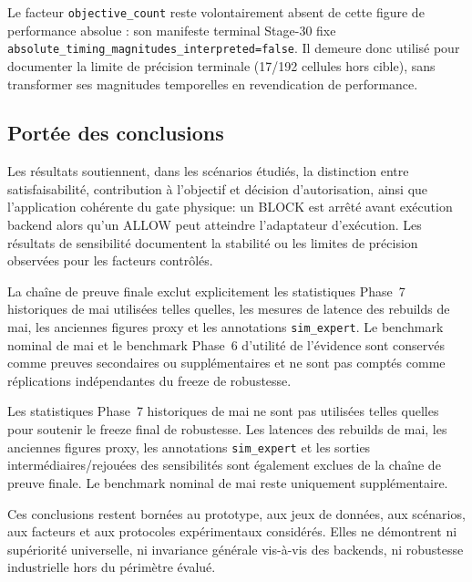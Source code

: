 Le facteur \texttt{objective\_count} reste volontairement absent de cette
figure de performance absolue : son manifeste terminal Stage-30 fixe
\texttt{absolute\_timing\_magnitudes\_interpreted=false}. Il demeure donc
utilisé pour documenter la limite de précision terminale (17/192 cellules
hors cible), sans transformer ses magnitudes temporelles en revendication
de performance.

\subsection{Portée des conclusions}

Les résultats soutiennent, dans les scénarios étudiés, la distinction
entre satisfaisabilité, contribution à l'objectif et décision
d'autorisation, ainsi que l'application cohérente du gate physique:
un BLOCK est arrêté avant exécution backend alors qu'un ALLOW peut
atteindre l'adaptateur d'exécution. Les résultats de sensibilité
documentent la stabilité ou les limites de précision observées pour
les facteurs contrôlés.


La chaîne de preuve finale exclut explicitement les statistiques Phase~7
historiques de mai utilisées telles quelles, les mesures de latence des
rebuilds de mai, les anciennes figures proxy et les annotations
\texttt{sim\_expert}. Le benchmark nominal de mai et le benchmark Phase~6
d'utilité de l'évidence sont conservés comme preuves secondaires ou
supplémentaires et ne sont pas comptés comme réplications indépendantes du
freeze de robustesse.

Les statistiques Phase~7 historiques de mai ne sont pas utilisées telles quelles pour soutenir le freeze final de robustesse. Les latences des rebuilds de mai, les anciennes figures proxy, les annotations \texttt{sim\_expert} et les sorties intermédiaires/rejouées des sensibilités sont également exclues de la chaîne de preuve finale. Le benchmark nominal de mai reste uniquement supplémentaire.

Ces conclusions restent bornées au prototype, aux jeux de données,
aux scénarios, aux facteurs et aux protocoles expérimentaux
considérés. Elles ne démontrent ni supériorité universelle, ni
invariance générale vis-à-vis des backends, ni robustesse
industrielle hors du périmètre évalué.
